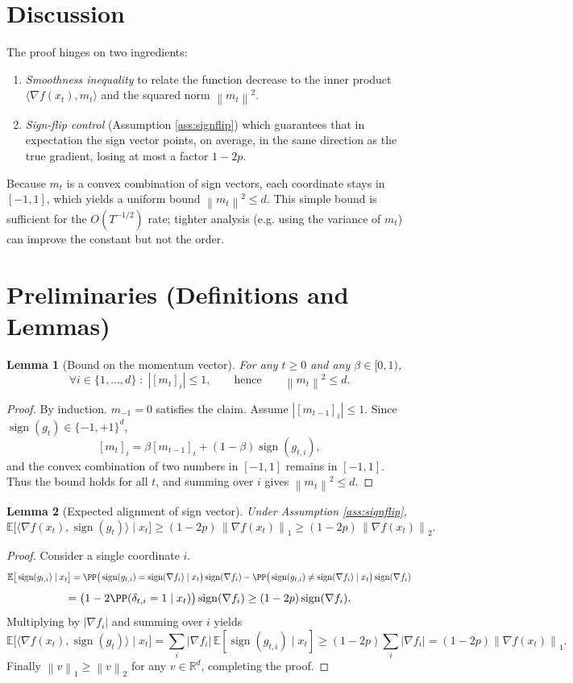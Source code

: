 \documentclass[11pt]{article}
\newtheorem{lemma}{Lemma}
\newcommand{\EE}{\mathbb{E}}
\newcommand{\RR}{\mathbb{R}}
\newcommand{\norm}[1]{\left\lVert#1\right\rVert}
\newcommand{\sign}{\operatorname{sign}}
\begin{document}
\section*{Discussion}
The proof hinges on two ingredients:
\begin{enumerate}
\item \emph{Smoothness inequality} to relate the function decrease to the inner product $\langle\nabla f(x_{t}),m_{t}\rangle$ and the squared norm $\norm{m_{t}}^{2}$.
\item \emph{Sign‑flip control} (Assumption \ref{ass:signflip}) which guarantees that in expectation the sign vector points, on average, in the same direction as the true gradient, losing at most a factor $1-2p$.
\end{enumerate}
Because $m_{t}$ is a convex combination of sign vectors, each coordinate stays in $[-1,1]$, which yields a uniform bound $\norm{m_{t}}^{2}\le d$. This simple bound is sufficient for the $O(T^{-1/2})$ rate; tighter analysis (e.g. using the variance of $m_{t}$) can improve the constant but not the order.

\section*{Preliminaries (Definitions and Lemmas)}
\begin{lemma}[Bound on the momentum vector]\label{lem:mtbound}
For any $t\ge0$ and any $\beta\in[0,1)$,
\[
\forall i\in\{1,\dots,d\}\;:\; |[m_{t}]_{i}|\le 1,
\qquad\text{hence}\qquad\norm{m_{t}}^{2}\le d .
\]
\end{lemma}
\begin{proof}
By induction. $m_{-1}=0$ satisfies the claim.
Assume $|[m_{t-1}]_{i}|\le1$. Since $\sign(g_{t})\in\{-1,+1\}^{d}$,
\[
[m_{t}]_{i}= \beta [m_{t-1}]_{i}+(1-\beta)\sign(g_{t,i}),
\]
and the convex combination of two numbers in $[-1,1]$ remains in $[-1,1]$.
Thus the bound holds for all $t$, and summing over $i$ gives $\norm{m_{t}}^{2}\le d$.
\end{proof}

\begin{lemma}[Expected alignment of sign vector]\label{lem:alignment}
Under Assumption \ref{ass:signflip},
\[
\EE\big[\langle \nabla f(x_{t}),\sign(g_{t})\rangle\mid x_{t}\big]
\ge (1-2p)\,\norm{\nabla f(x_{t})}_{1}
\ge (1-2p)\,\norm{\nabla f(x_{t})}_{2}.
\]
\end{lemma}
\begin{proof}
Consider a single coordinate $i$.
\[
\EE\big[\sign(g_{t,i})\mid x_{t}\big]
= \PP\big(\sign(g_{t,i})=\sign(\nabla f_{i})\mid x_{t}\big)\sign(\nabla f_{i})
   -\PP\big(\sign(g_{t,i})\neq\sign(\nabla f_{i})\mid x_{t}\big)\sign(\nabla f_{i})
\]
\[
= \big(1-2\PP(\delta_{t,i}=1\mid x_{t})\big)\sign(\nabla f_{i})
\ge (1-2p)\sign(\nabla f_{i}).
\]
Multiplying by $|\nabla f_{i}|$ and summing over $i$ yields
\[
\EE\big[\langle\nabla f(x_{t}),\sign(g_{t})\rangle\mid x_{t}\big]
= \sum_{i} |\nabla f_{i}|\,\EE[\sign(g_{t,i})\mid x_{t}]
\ge (1-2p)\sum_{i} |\nabla f_{i}|
= (1-2p)\norm{\nabla f(x_{t})}_{1}.
\]
Finally $\norm{v}_{1}\ge\norm{v}_{2}$ for any $v\in\RR^{d}$, completing the proof.
\end{proof}
\end{document}
